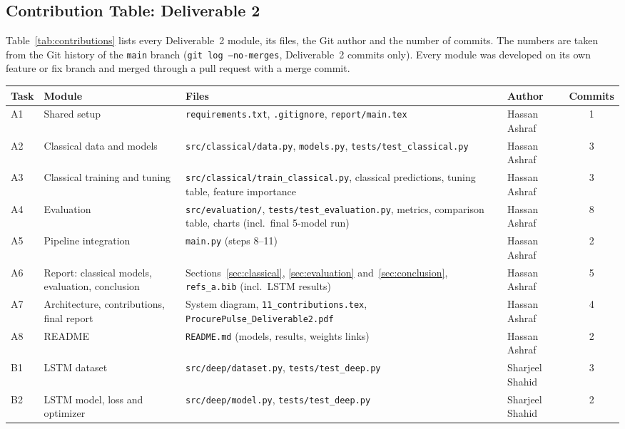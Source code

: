 \subsection{Contribution Table: Deliverable 2}

Table~\ref{tab:contributions} lists every Deliverable~2 module, its files, the
Git author and the number of commits. The numbers are taken from the Git
history of the \texttt{main} branch (\texttt{git log --no-merges}, Deliverable~2
commits only). Every module was developed on its own feature or fix branch and
merged through a pull request with a merge commit.

\begin{table}[H]
  \centering
  \small
  \sloppy
  \begin{tabular}{p{0.8cm}p{3.1cm}p{6.3cm}p{2.5cm}c}
    \toprule
    Task & Module & Files & Author & Commits \\
    \midrule
    A1 & Shared setup & \texttt{requirements.txt}, \texttt{.gitignore}, \texttt{report/main.tex} & Hassan Ashraf & 1 \\
    A2 & Classical data and models & \texttt{src/classical/data.py}, \texttt{models.py}, \texttt{tests/test\_classical.py} & Hassan Ashraf & 3 \\
    A3 & Classical training and tuning & \texttt{src/classical/train\_classical.py}, classical predictions, tuning table, feature importance & Hassan Ashraf & 3 \\
    A4 & Evaluation & \texttt{src/evaluation/}, \texttt{tests/test\_evaluation.py}, metrics, comparison table, charts (incl.\ final 5-model run) & Hassan Ashraf & 8 \\
    A5 & Pipeline integration & \texttt{main.py} (steps 8--11) & Hassan Ashraf & 2 \\
    A6 & Report: classical models, evaluation, conclusion & Sections~\ref{sec:classical}, \ref{sec:evaluation} and~\ref{sec:conclusion}, \texttt{refs\_a.bib} (incl.\ LSTM results) & Hassan Ashraf & 5 \\
    A7 & Architecture, contributions, final report & System diagram, \texttt{11\_contributions.tex}, \texttt{ProcurePulse\_Deliverable2.pdf} & Hassan Ashraf & 4 \\
    A8 & README & \texttt{README.md} (models, results, weights links) & Hassan Ashraf & 2 \\
    \midrule
    B1 & LSTM dataset & \texttt{src/deep/dataset.py}, \texttt{tests/test\_deep.py} & Sharjeel Shahid & 3 \\
    B2 & LSTM model, loss and optimizer & \texttt{src/deep/model.py}, \texttt{tests/test\_deep.py} & Sharjeel Shahid & 2 \\

\end{tabular}
\end{table}
